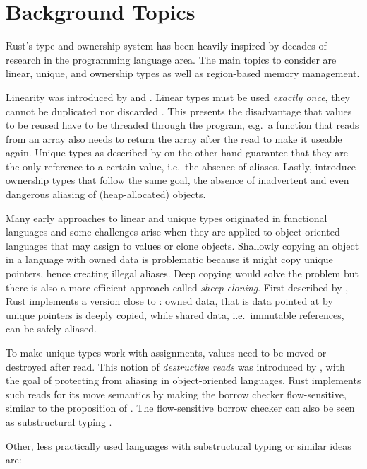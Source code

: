 \section{Background Topics}

Rust's type and ownership system has been heavily inspired by decades of
research in the programming language area. The main topics to consider are
linear, unique, and ownership types as well as region-based memory management.

Linearity was introduced by \citet{girard} and \citet{Wadler90lineartypes}.
Linear types must be used \emph{exactly once}, they cannot be duplicated nor
discarded \cite{use-once}. This presents the disadvantage that values to be
reused have to be threaded through the program, e.g.~a function that reads from
an array also needs to return the array after the read to make it useable again.
Unique types as described by \citet{alias-free-pointers} on the other hand
guarantee that they are the only reference to a certain value, i.e.~the absence
of aliases. Lastly, \citet{ownership-types} introduce ownership types that
follow the same goal, the absence of inadvertent and even dangerous aliasing of
(heap-allocated) objects.

Many early approaches to linear and unique types originated in functional
languages and some challenges arise when they are applied to object-oriented
languages that may assign to values or clone objects. Shallowly copying an
object in a language with owned data is problematic because it might copy unique
pointers, hence creating illegal aliases. Deep copying would solve the problem
but there is also a more efficient approach called \emph{sheep cloning}. First
described by \citet{dynamic-alias-protection}, Rust implements a version close
to \cite{sheep-cloning}: owned data, that is data pointed at by unique pointers
is deeply copied, while shared data, i.e.~immutable references, can be safely
aliased.

To make unique types work with assignments, values need to be moved or destroyed
after read. This notion of \emph{destructive reads} was introduced by
\citet{islands-alias-protection}, with the goal of protecting from aliasing in
object-oriented languages. Rust implements such reads for its move semantics by
making the borrow checker flow-sensitive, similar to the proposition of
\citet{alias-burying}. The flow-sensitive borrow checker can also be seen as
substructural typing \cite{oxide}.

Other, less practically used languages with substructural typing or
similar ideas are:

